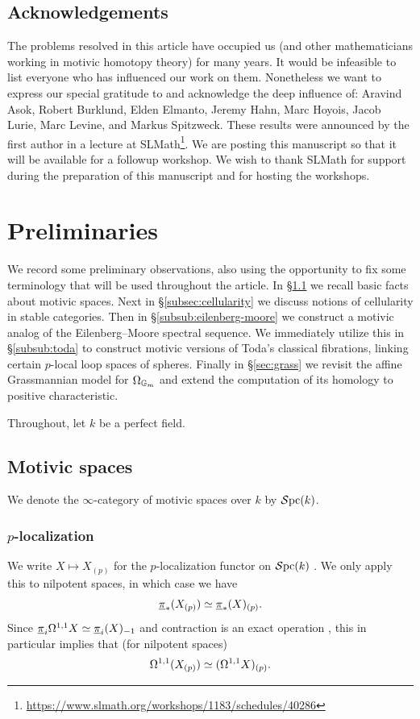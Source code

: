 \documentclass{amsart}
\numberwithin{proposition}{section}
\numberwithin{equation}{section}
\begin{document}
\subsection{Acknowledgements} The problems resolved in this article
have occupied us (and other mathematicians working in motivic homotopy
theory) for many years.  It would be infeasible to list everyone who
has influenced our work on them.  Nonetheless we want to express our
special gratitude to and acknowledge the deep influence of: Aravind
Asok, Robert Burklund, Elden Elmanto, Jeremy Hahn, Marc Hoyois, Jacob
Lurie, Marc Levine, and Markus Spitzweck.  These results were announced by
the first author in a lecture at
SLMath\footnote{\url{https://www.slmath.org/workshops/1183/schedules/40286}}.  We are
posting this manuscript so that it will be available for a followup
workshop.  We wish to thank SLMath for support during the
preparation of this manuscript and for hosting the workshops.


\section{Preliminaries} \label{sec:prelim}
We record some preliminary observations, also using the opportunity to fix some terminology that will be used throughout the article.
In \S\ref{subsec:mot-spc} we recall basic facts about motivic spaces.
Next in \S\ref{subsec:cellularity} we discuss notions of cellularity in stable categories.
Then in \S\ref{subsub:eilenberg-moore} we construct a motivic analog of the Eilenberg--Moore spectral sequence.
We immediately utilize this in \S\ref{subsub:toda} to construct motivic versions of Toda's classical fibrations, linking certain $p$-local loop spaces of spheres.
Finally in \S\ref{sec:grass} we revisit the affine Grassmannian model for $\Omega_{\mathbb{G}_m}$ and extend the computation of its homology to positive characteristic.

Throughout, let $k$ be a perfect field.

\subsection{Motivic spaces} \label{subsec:mot-spc}
We denote the $\infty$-category of motivic spaces over $k$ \cite[\S2.2]{bachmann-norms} by $\mathcal{S}\mathrm{pc}{}(k)$.

\subsubsection{$p$-localization} \label{subsec:p-loc}
We write $X \mapsto X_{(p)}$ for the $p$-localization functor on $\mathcal{S}\mathrm{pc}{}(k)$ \cite[\S4]{AFHLocalization}.
We only apply this to nilpotent spaces, in which case we have \cite[Theorem~4.3.9(1)]{AFHLocalization} \[ \underline\pi_*(X_{(p)}) \simeq \underline\pi_*(X)_{(p)}. \]
Since $\underline\pi_i \Omega^{1,1} X \simeq \underline \pi_i(X)_{-1}$ \cite[Theorem~3.1.19(2)]{AFHLocalization} and contraction is an exact operation \cite[Proposition~3.1.18(3)]{AFHLocalization}, this in particular implies that (for nilpotent spaces) \[ \Omega^{1,1}(X_{(p)}) \simeq (\Omega^{1,1} X)_{(p)}. \]
\end{document}
